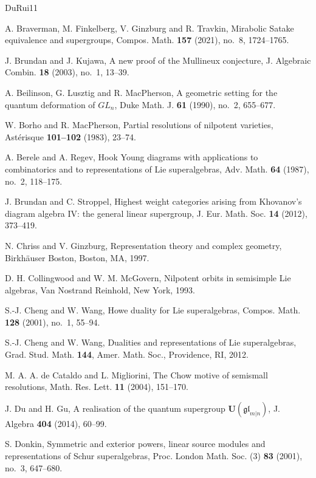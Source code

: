 \documentclass[11pt,a4paper]{amsart}
\theoremstyle{definition}
\theoremstyle{remark}
\numberwithin{equation}{section}
\begin{document}
\begin{thebibliography}{DuRui11}
\raggedright
{}
A. Braverman, M. Finkelberg, V. Ginzburg and R. Travkin,
Mirabolic Satake equivalence and supergroups,
Compos. Math. \textbf{157} (2021), no.~8, 1724--1765.

J. Brundan and J. Kujawa,
A new proof of the Mullineux conjecture,
J. Algebraic Combin. \textbf{18} (2003), no.~1, 13--39.

A. Beilinson, G. Lusztig and R. MacPherson,
A geometric setting for the quantum deformation of $GL_n$,
Duke Math. J. \textbf{61} (1990), no.~2, 655--677.

W. Borho and R. MacPherson,
Partial resolutions of nilpotent varieties,
Ast\'erisque \textbf{101--102} (1983), 23--74.

A. Berele and A. Regev,
Hook Young diagrams with applications to combinatorics and to
representations of Lie superalgebras,
Adv. Math. \textbf{64} (1987), no.~2, 118--175.

J. Brundan and C. Stroppel,
Highest weight categories arising from Khovanov's diagram algebra IV:
the general linear supergroup,
J. Eur. Math. Soc. \textbf{14} (2012), 373--419.

N. Chriss and V. Ginzburg,
Representation theory and complex geometry,
Birkh\"auser Boston, Boston, MA, 1997.

D. H. Collingwood and W. M. McGovern,
Nilpotent orbits in semisimple Lie algebras,
Van Nostrand Reinhold, New York, 1993.

S.-J. Cheng and W. Wang,
Howe duality for Lie superalgebras,
Compos. Math. \textbf{128} (2001), no.~1, 55--94.

S.-J. Cheng and W. Wang,
Dualities and representations of Lie superalgebras,
Grad. Stud. Math. \textbf{144}, Amer. Math. Soc., Providence, RI, 2012.

M. A. A. de Cataldo and L. Migliorini,
The Chow motive of semismall resolutions,
Math. Res. Lett. \textbf{11} (2004), 151--170.

J. Du and H. Gu,
A realisation of the quantum supergroup $\mathbf{U}(\mathfrak{gl}_{m|n})$,
J. Algebra \textbf{404} (2014), 60--99.

S. Donkin,
Symmetric and exterior powers, linear source modules and representations
of Schur superalgebras,
Proc. London Math. Soc. (3) \textbf{83} (2001), no.~3, 647--680.


\end{thebibliography}
\end{document}
